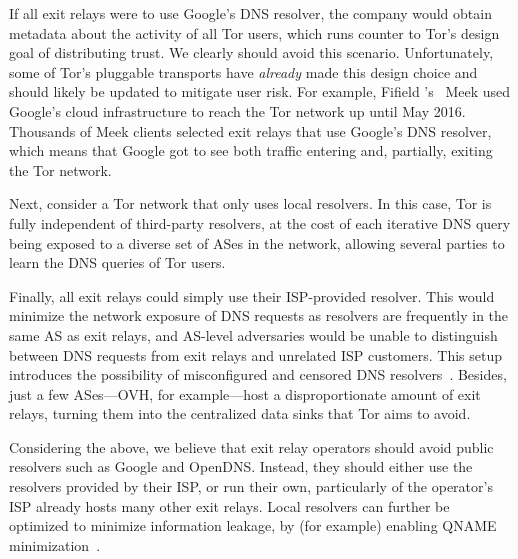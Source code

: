 If all exit relays were to use Google's DNS resolver, the company would
obtain metadata about the activity of all Tor users, which runs counter to
Tor's design goal of distributing trust.  We clearly should avoid this
scenario. Unfortunately, some of Tor's pluggable transports
have {\em already} made this design choice and should likely be updated
to mitigate user risk.  For example, Fifield \ea's~\cite{Fifield2015a}
Meek used Google's cloud infrastructure
to reach the Tor network up until May 2016.
Thousands of Meek clients
selected exit relays that use Google's DNS resolver, which means that Google
got to see both traffic entering and, partially, exiting the Tor
network.

Next, consider a Tor network that only uses local resolvers.  In this
case, Tor is fully independent of third-party resolvers, at the cost of
each iterative DNS query being exposed to a diverse set of ASes in the
network, allowing several parties to learn the DNS queries of Tor users.

Finally, all exit
relays could simply use their ISP-provided resolver.  This would minimize the
network exposure of DNS requests as resolvers are frequently in the same AS as
exit relays, and AS-level adversaries would be unable to distinguish
between DNS requests from exit relays and unrelated ISP customers.  This
setup introduces the possibility of misconfigured and censored DNS
resolvers~\cite[\S~4.1]{Winter2014b}.  Besides, just a few ASes---OVH, for
example---host a disproportionate amount of exit relays, turning them into the
centralized data sinks that Tor aims to avoid.

Considering the above, we believe that exit relay operators should avoid
public resolvers such as Google and OpenDNS.  Instead, they should
either use the resolvers provided by their ISP, or run their own,
particularly of the operator's
ISP already hosts many other exit relays.  Local
resolvers can further be optimized to minimize information leakage,
by (for example) enabling QNAME minimization~\cite{qname-minimization}.


